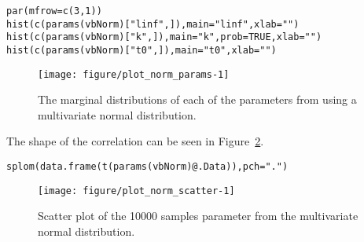 \documentclass[a4paper,english,10pt]{article}\usepackage[]{graphicx}\usepackage[]{color}
\makeatletter
\def\maxwidth{ %
  \ifdim\Gin@nat@width>\linewidth
    \linewidth
  \else
    \Gin@nat@width
  \fi
}
\newcommand{\hlnum}[1]{\textcolor[rgb]{0.2,0.2,0.2}{#1}}%
\newcommand{\hlstr}[1]{\textcolor[rgb]{0.2,0.2,0.2}{#1}}%
\newcommand{\hlopt}[1]{\textcolor[rgb]{0.2,0.2,0.2}{#1}}%
\newcommand{\hlstd}[1]{\textcolor[rgb]{0,0,0}{#1}}%
\newcommand{\hlkwc}[1]{\textcolor[rgb]{0.361,0.506,0.596}{#1}}%
\newcommand{\hlkwd}[1]{\textcolor[rgb]{0.361,0.506,0.596}{#1}}%
\newenvironment{kframe}{%
 \def\at@end@of@kframe{}%
 \ifinner\ifhmode%
  \def\at@end@of@kframe{\end{minipage}}%
  \begin{minipage}{\columnwidth}%
 \fi\fi%
 \def\FrameCommand##1{\hskip\@totalleftmargin \hskip-\fboxsep
 \colorbox{shadecolor}{##1}\hskip-\fboxsep
     \hskip-\linewidth \hskip-\@totalleftmargin \hskip\columnwidth}%
 \MakeFramed {\advance\hsize-\width
   \@totalleftmargin\z@ \linewidth\hsize
   \@setminipage}}%
 {\par\unskip\endMakeFramed%
 \at@end@of@kframe}
\newenvironment{knitrout}{}{} %
\makeatother
\begin{document}
\begin{knitrout}
\color{fgcolor}\begin{kframe}
\begin{alltt}
\hlkwd{par}\hlstd{(}\hlkwc{mfrow}\hlstd{=}\hlkwd{c}\hlstd{(}\hlnum{3}\hlstd{,}\hlnum{1}\hlstd{))}
\hlkwd{hist}\hlstd{(}\hlkwd{c}\hlstd{(}\hlkwd{params}\hlstd{(vbNorm)[}\hlstr{"linf"}\hlstd{,]),} \hlkwc{main}\hlstd{=}\hlstr{"linf"}\hlstd{,} \hlkwc{xlab}\hlstd{=}\hlstr{""}\hlstd{)}
\hlkwd{hist}\hlstd{(}\hlkwd{c}\hlstd{(}\hlkwd{params}\hlstd{(vbNorm)[}\hlstr{"k"}\hlstd{,]),} \hlkwc{main}\hlstd{=}\hlstr{"k"}\hlstd{,} \hlkwc{prob}\hlstd{=}\hlnum{TRUE}\hlstd{,} \hlkwc{xlab}\hlstd{=}\hlstr{""}\hlstd{)}
\hlkwd{hist}\hlstd{(}\hlkwd{c}\hlstd{(}\hlkwd{params}\hlstd{(vbNorm)[}\hlstr{"t0"}\hlstd{,]),} \hlkwc{main}\hlstd{=}\hlstr{"t0"}\hlstd{,} \hlkwc{xlab}\hlstd{=}\hlstr{""}\hlstd{)}
\end{alltt}
\end{kframe}\begin{figure}[H]

{\centering \texttt{[image: figure/plot\_norm\_params-1]} 

}

\caption[The marginal distributions of each of the parameters from using a multivariate normal distribution]{The marginal distributions of each of the parameters from using a multivariate normal distribution.}\label{fig:plot_norm_params}
\end{figure}


\end{knitrout}

The shape of the correlation can be seen in Figure~\ref{fig:plot_norm_scatter}.
\begin{knitrout}
\color{fgcolor}\begin{kframe}
\begin{alltt}
\hlkwd{splom}\hlstd{(}\hlkwd{data.frame}\hlstd{(}\hlkwd{t}\hlstd{(}\hlkwd{params}\hlstd{(vbNorm)}\hlopt{@}\hlkwc{.Data}\hlstd{)),} \hlkwc{pch}\hlstd{=}\hlstr{"."}\hlstd{)}
\end{alltt}
\end{kframe}\begin{figure}[H]

{\centering \texttt{[image: figure/plot\_norm\_scatter-1]} 

}

\caption[Scatter plot of the 10000 samples parameter from the multivariate normal distribution]{Scatter plot of the 10000 samples parameter from the multivariate normal distribution.}\label{fig:plot_norm_scatter}
\end{figure}


\end{knitrout}
\end{document}
